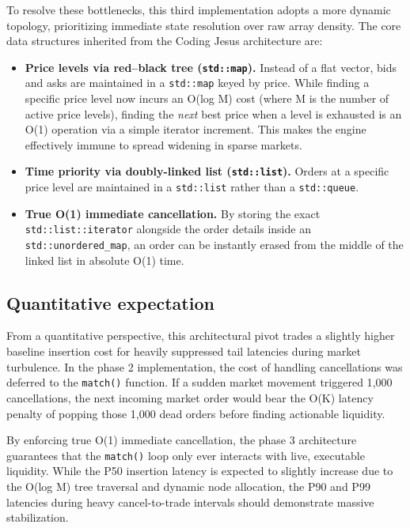 \documentclass[11pt,a4paper]{article}
\begin{document}
To resolve these bottlenecks, this third implementation adopts a more
dynamic topology, prioritizing immediate state resolution over raw array
density. The core data structures inherited from the Coding Jesus
architecture are:

\begin{itemize}
\item \textbf{Price levels via red--black tree (\texttt{std::map}).} Instead
      of a flat vector, bids and asks are maintained in a \texttt{std::map}
      keyed by price. While finding a specific price level now incurs an
      O(log M) cost (where M is the number of active price levels), finding
      the \emph{next} best price when a level is exhausted is an O(1)
      operation via a simple iterator increment. This makes the engine
      effectively immune to spread widening in sparse markets.
\item \textbf{Time priority via doubly-linked list (\texttt{std::list}).}
      Orders at a specific price level are maintained in a
      \texttt{std::list} rather than a \texttt{std::queue}.
\item \textbf{True O(1) immediate cancellation.} By storing the exact
      \texttt{std::list::iterator} alongside the order details inside an
      \texttt{std::unordered\_map}, an order can be instantly erased from
      the middle of the linked list in absolute O(1) time.
\end{itemize}

\subsection{Quantitative expectation}

From a quantitative perspective, this architectural pivot trades a slightly
higher baseline insertion cost for heavily suppressed tail latencies during
market turbulence. In the phase 2 implementation, the cost of handling
cancellations was deferred to the \texttt{match()} function. If a sudden
market movement triggered 1{,}000 cancellations, the next incoming market
order would bear the O(K) latency penalty of popping those 1{,}000 dead
orders before finding actionable liquidity.

By enforcing true O(1) immediate cancellation, the phase 3 architecture
guarantees that the \texttt{match()} loop only ever interacts with live,
executable liquidity. While the P50 insertion latency is expected to
slightly increase due to the O(log M) tree traversal and dynamic node
allocation, the P90 and P99 latencies during heavy cancel-to-trade
intervals should demonstrate massive stabilization.
\end{document}
